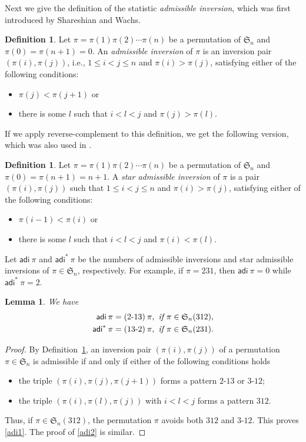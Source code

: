 \documentclass[12pt,reqno]{amsart}
\numberwithin{equation}{section}
\theoremstyle{plain}
\newtheorem{lemma}[theorem]{Lemma}
\theoremstyle{definition}
\newtheorem{Def}[theorem]{Definition}
\def\S{\mathfrak{S}}
\def\ai{\mathsf{adi}}
\def\acb{13\text{-}2}
\def\bac{2\text{-}13}
\begin{document}
Next we give the definition of the statistic \emph{admissible inversion}, which was first introduced by Shareshian and Wachs\cite{SW}.

\begin{Def}\label{ai1}
Let $\pi=\pi(1)\pi(2)\cdots \pi(n)$ be a permutation of $\S_{n}$ and $\pi(0)=\pi(n+1)=0$.  An \emph{admissible inversion} of $\pi$ is an inversion
 pair $(\pi(i),\pi(j))$, i.e., $1\leq i<j\leq n$ and $\pi(i)>\pi(j)$,
  satisfying  either of the following conditions:
\begin{itemize}
 \item $\pi(j)<\pi(j+1)$ or
 \item there is some $l$ such that $i<l<j$ and $\pi(j)>\pi(l)$.
\end{itemize}
\end{Def}
If we apply reverse-complement to this definition, we get the following version, which was also used in \cite[Definition 1]{LZ15}.
\begin{Def}\label{ai2}
Let $\pi=\pi(1)\pi(2)\cdots \pi(n)$ be a permutation of $\S_{n}$ and $\pi(0)=\pi(n+1)=n+1$.
A \emph{star admissible inversion} of $\pi$ is a pair $(\pi(i),\pi(j))$ such that $1\leq i<j\leq n$ and $\pi(i)>\pi(j)$, satisfying either of the following conditions:
\begin{itemize}
 \item $\pi(i-1)<\pi(i)$ or
 \item there is some $l$ such that $i<l<j$ and $\pi(i)<\pi(l)$.
\end{itemize}
\end{Def}

Let $\ai\:\pi$ and $\ai^*\:\pi$ be the numbers of admissible inversions and star admissible inversions of $\pi\in \S_n$, respectively. For example,
if $\pi=231$, then $\ai\:\pi=0$ while $\ai^*\:\pi=2$.

\begin{lemma}\label{ai=pattern}
We have
\begin{align}
\ai\:\pi&=(\bac)\:\pi, \emph{ if }\pi\in \S_n(312),\label{adi1}\\
\ai^*\:\pi&=(\acb)\:\pi, \emph{ if }\pi\in \S_n(231).\label{adi2}
\end{align}
\end{lemma}

\begin{proof}
By Definition~\ref{ai1}, an inversion pair $(\pi(i), \pi(j))$ of a permutation $\pi\in \S_n$ is admissible if and only if  either of the following conditions holds
\begin{itemize}
\item the triple $(\pi(i), \pi(j), \pi(j+1))$ forms a pattern $\bac$ or $3\text{-}12$;
\item the triple $(\pi(i), \pi(l), \pi(j))$ with $i<l<j$ forms a pattern $312$.
\end{itemize}
Thus, if $\pi\in \S_n(312)$, the permutation $\pi$ avoids both $312$ and $3\text{-}12$. This proves \eqref{adi1}. The proof of \eqref{adi2} is similar.
\end{proof}
\end{document}

